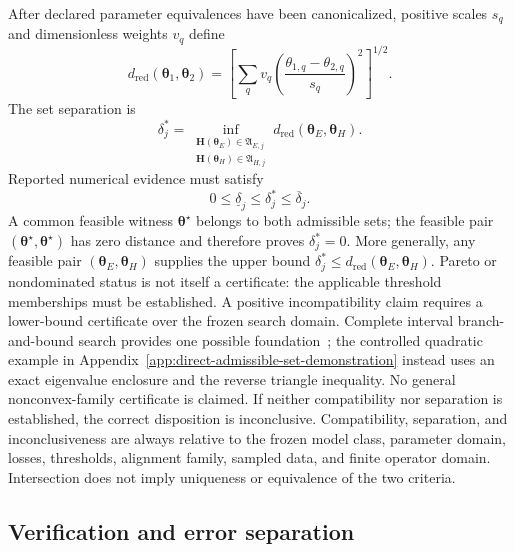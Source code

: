 \documentclass[preprint,12pt]{elsarticle}
\begin{document}
After declared parameter equivalences have been canonicalized, positive scales
$s_q$ and dimensionless weights $v_q$ define
\begin{equation}
 d_{\mathrm{red}}(\bm{\theta}_1,\bm{\theta}_2)
 =\left[
 \sum_q v_q
 \left(\frac{\theta_{1,q}-\theta_{2,q}}{s_q}\right)^2
 \right]^{1/2}.
 \label{eq:parameter-distance}
\end{equation}
The set separation is
\begin{equation}
 \delta_j^{\ast}
 =\inf_{\substack{
 \bm{H}(\bm{\theta}_E)\in\mathfrak{A}_{E,j}\\
 \bm{H}(\bm{\theta}_H)\in\mathfrak{A}_{H,j}}}
 d_{\mathrm{red}}(\bm{\theta}_E,\bm{\theta}_H).
 \label{eq:set-separation}
\end{equation}
Reported numerical evidence must satisfy
\begin{equation}
 0\leq\underline{\delta}_j\leq\delta_j^{\ast}
 \leq\overline{\delta}_j.
 \label{eq:separation-bounds}
\end{equation}
A common feasible witness $\bm\theta^\star$ belongs to both admissible sets;
the feasible pair $(\bm\theta^\star,\bm\theta^\star)$ has zero distance and
therefore proves $\delta_j^\ast=0$. More generally, any feasible pair
$(\bm\theta_E,\bm\theta_H)$ supplies the upper bound
$\delta_j^\ast\leq d_{\mathrm{red}}(\bm\theta_E,\bm\theta_H)$. Pareto or
nondominated status is not itself a certificate: the applicable threshold
memberships must be established. A positive incompatibility claim requires a
lower-bound certificate over the frozen search domain. Complete interval
branch-and-bound search provides one possible foundation~\cite{neumaier2004,moore2009};
the controlled quadratic example in
Appendix~\ref{app:direct-admissible-set-demonstration} instead uses an exact
eigenvalue enclosure and the reverse triangle inequality. No general
nonconvex-family certificate is claimed. If neither compatibility nor
separation is established, the correct disposition is inconclusive.
Compatibility, separation, and inconclusiveness
are always relative to the frozen model class, parameter domain, losses,
thresholds, alignment family, sampled data, and finite operator domain.
Intersection does not imply uniqueness or equivalence of the two criteria.

\subsection{Verification and error separation}
\label{sec:verification}
\end{document}
